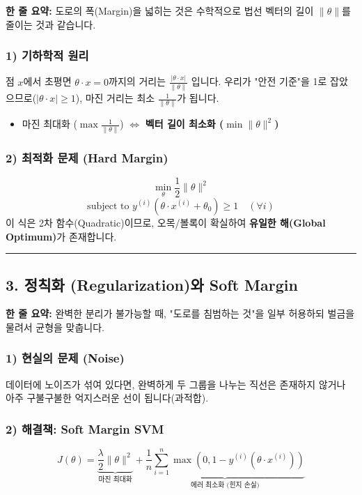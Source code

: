 \documentclass[11pt,a4paper]{book}
\theoremstyle{definition}
\begin{document}
\begin{conceptbox}[title={개념 2: 도로 확장 공사}]
\textbf{한 줄 요약:} 도로의 폭(Margin)을 넓히는 것은 수학적으로 법선 벡터의 길이 $\|\theta\|$를 줄이는 것과 같습니다.
\end{conceptbox}

\subsubsection*{1) 기하학적 원리}
점 $x$에서 초평면 $\theta \cdot x = 0$까지의 거리는 $\frac{|\theta \cdot x|}{\|\theta\|}$ 입니다.
우리가 "안전 기준"을 1로 잡았으므로($|\theta \cdot x| \ge 1$), 마진 거리는 최소 $\frac{1}{\|\theta\|}$가 됩니다.
\begin{itemize}
    \item 마진 최대화 ($\max \frac{1}{\|\theta\|}$) $\iff$ \textbf{벡터 길이 최소화 ($\min \|\theta\|^2$)}
\end{itemize}

\subsubsection*{2) 최적화 문제 (Hard Margin)}
$$ \min_{\theta} \frac{1}{2} \|\theta\|^2 $$
$$ \text{subject to } y^{(i)}(\theta \cdot x^{(i)} + \theta_0) \ge 1 \quad (\forall i) $$
이 식은 2차 함수(Quadratic)이므로, 오목/볼록이 확실하여 \textbf{유일한 해(Global Optimum)}가 존재합니다.

\vspace{0.5cm}\hrule\vspace{0.5cm}

\subsection{3. 정칙화 (Regularization)와 Soft Margin}

\begin{conceptbox}[title={개념 3: 융통성 있는 보안관}]
\textbf{한 줄 요약:} 완벽한 분리가 불가능할 때, "도로를 침범하는 것"을 일부 허용하되 벌금을 물려서 균형을 맞춥니다.
\end{conceptbox}

\subsubsection*{1) 현실의 문제 (Noise)}
데이터에 노이즈가 섞여 있다면, 완벽하게 두 그룹을 나누는 직선은 존재하지 않거나 아주 구불구불한 억지스러운 선이 됩니다(과적합).

\subsubsection*{2) 해결책: Soft Margin SVM}
$$ J(\theta) = \underbrace{\frac{\lambda}{2} \|\theta\|^2}_{\text{마진 최대화}} + \underbrace{\frac{1}{n} \sum_{i=1}^n \max(0, 1 - y^{(i)}(\theta \cdot x^{(i)}))}_{\text{에러 최소화 (힌지 손실)}} $$
\end{document}
